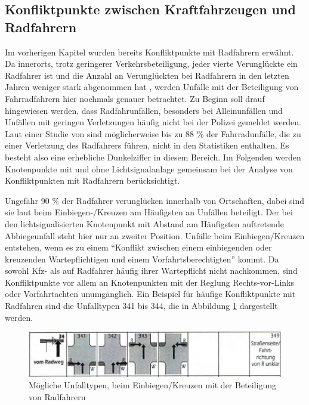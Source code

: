\subsection{Konfliktpunkte zwischen Kraftfahrzeugen und Radfahrern}
Im vorherigen Kapitel wurden bereits Konfliktpunkte mit Radfahrern erwähnt. Da innerorts, trotz geringerer Verkehrsbeteiligung, jeder vierte Verunglückte ein Radfahrer ist \parencite[S. 303]{Schreiber.2014b} und die Anzahl an Verunglückten bei Radfahrern in den letzten Jahren weniger stark abgenommen hat \parencite[S. 7]{Below.2016}, werden Unfälle mit der Beteiligung von Fahrradfahrern hier nochmals genauer betrachtet. Zu Beginn soll drauf hingewiesen werden, dass Radfahrunfällen, besonders bei Alleinunfällen und Unfällen mit geringen Verletzungen häufig nicht bei der Polizei gemeldet werden. Laut einer Studie von \Textcite[S. 80]{Below.2016} sind möglicherweise bis zu 88 \% der Fahrradunfälle, die zu einer Verletzung des Radfahrers führen, nicht in den Statistiken enthalten. Es besteht also eine erhebliche Dunkelziffer in diesem Bereich. Im Folgenden werden Knotenpunkte mit und ohne Lichtsignalanlage gemeinsam bei der Analyse von Konfliktpunkten mit Radfahrern berücksichtigt.

Ungefähr 90 \% \parencite[S. 10]{Below.2016} der Radfahrer verunglücken innerhalb von Ortschaften, dabei sind sie laut \Textcite[S. 303]{Schreiber.2014b} beim Einbiegen-/Kreuzen am Häufigsten an Unfällen beteiligt. Der bei den lichtsignalisierten Knotenpunkt mit Abstand am Häufigsten auftretende Abbiegeunfall steht hier nur an zweiter Position. Unfälle beim Einbiegen/Kreuzen entstehen, wenn es zu einem \enquote{Konflikt zwischen einem einbiegenden oder kreuzenden Wartepflichtigen und einem Vorfahrtsberechtigten} \parencite[S. 12]{GesamtverbandderDeutschenVersicherungswirtschafte.V..2016} kommt. Da sowohl \ac{Kfz}- als auf Radfahrer häufig ihrer Wartepflicht nicht nachkommen, sind Konfliktpunkte vor allem an Knotenpunkten mit der Reglung Rechts-vor-Links oder Vorfahrtachten unumgänglich. Ein Beispiel für häufige Konfliktpunkte mit Radfahren sind die Unfalltypen 341 bis 344, die in Abbildung \ref{fig:Einbiege-Unfall_Rad} dargestellt werden.

\begin{savenotes}
	\begin{figure}[H]
		\centering
		\includegraphics[width=13cm,height=2cm]{figures/Einbiege-Unfall_Rad}
		\caption[Unfalltyp 3 Einbiegen/Kreuzen-Unfall mit Radfarerbeteiligung]{Mögliche Unfalltypen, beim Einbiegen/Kreuzen mit der Beteiligung von Radfahrern \parencite[S. 13]{GesamtverbandderDeutschenVersicherungswirtschafte.V..2016}}\label{fig:Einbiege-Unfall_Rad}
	\end{figure}
\end{savenotes}

